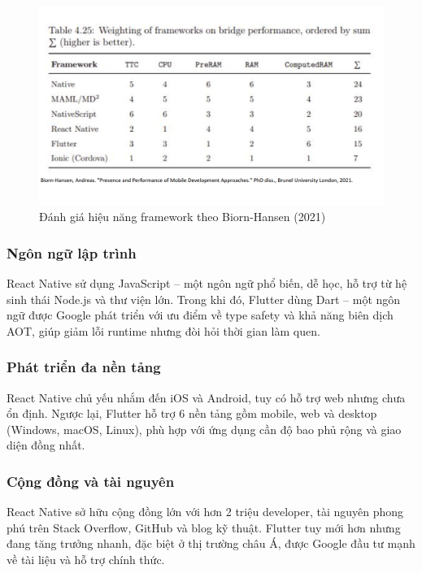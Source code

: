 \begin{figure}[H]
    \centering
    \includegraphics[width=0.7\linewidth]{images/performance.png}
    \caption{Đánh giá hiệu năng framework theo Biorn-Hansen (2021)}
    \label{fig:overall}
\end{figure}

\subsubsection{Ngôn ngữ lập trình}
\begin{flushleft}
  \hspace*{0.8cm}React Native sử dụng JavaScript – một ngôn ngữ phổ biến, dễ học, hỗ trợ từ hệ sinh thái Node.js và thư viện lớn. Trong khi đó, Flutter dùng Dart – một ngôn ngữ được Google phát triển với ưu điểm về type safety và khả năng biên dịch AOT, giúp giảm lỗi runtime nhưng đòi hỏi thời gian làm quen.
\end{flushleft}

\subsubsection{Phát triển đa nền tảng}
\begin{flushleft}
  \hspace*{0.8cm}React Native chủ yếu nhắm đến iOS và Android, tuy có hỗ trợ web nhưng chưa ổn định. Ngược lại, Flutter hỗ trợ 6 nền tảng gồm mobile, web và desktop (Windows, macOS, Linux), phù hợp với ứng dụng cần độ bao phủ rộng và giao diện đồng nhất.
\end{flushleft}

\subsubsection{Cộng đồng và tài nguyên}
\begin{flushleft}
  \hspace*{0.8cm}React Native sở hữu cộng đồng lớn với hơn 2 triệu developer, tài nguyên phong phú trên Stack Overflow, GitHub và blog kỹ thuật. Flutter tuy mới hơn nhưng đang tăng trưởng nhanh, đặc biệt ở thị trường châu Á, được Google đầu tư mạnh về tài liệu và hỗ trợ chính thức.
\end{flushleft}

